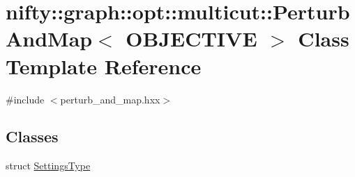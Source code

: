 \hypertarget{classnifty_1_1graph_1_1opt_1_1multicut_1_1PerturbAndMap}{}\section{nifty\+:\+:graph\+:\+:opt\+:\+:multicut\+:\+:Perturb\+And\+Map$<$ O\+B\+J\+E\+C\+T\+I\+VE $>$ Class Template Reference}
\label{classnifty_1_1graph_1_1opt_1_1multicut_1_1PerturbAndMap}


{\ttfamily \#include $<$perturb\+\_\+and\+\_\+map.\+hxx$>$}

\subsection*{Classes}
\begin{DoxyCompactItemize}
\item 
struct \hyperlink{structnifty_1_1graph_1_1opt_1_1multicut_1_1PerturbAndMap_1_1SettingsType}{Settings\+Type}
\end{DoxyCompactItemize}
